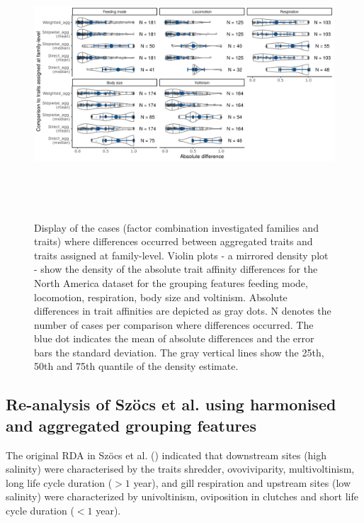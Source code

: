 \documentclass{article}
\begin{document}
\begin{figure}[H]
  \centering
  \includegraphics[width=16.5cm, height=10cm]{Deviances_trait_agg_pyne.png}
  \caption{Display of the cases (factor combination investigated families and traits) where differences occurred between aggregated traits and traits assigned at family-level. Violin plots - a mirrored density plot - show the density of the absolute trait affinity differences for the North America dataset for the grouping features feeding mode, locomotion, respiration, body size and voltinism. Absolute differences in trait affinities are depicted as gray dots. N denotes the number of cases per comparison where differences occurred. The blue dot indicates the mean of absolute differences and the error bars the standard deviation. The gray vertical lines show the 25th, 50th and 75th quantile of the density estimate.}
  \label{fig:diff_aggr_traits_pyne}
\end{figure}

\newpage 


\subsection*{Re-analysis of Szöcs et al. using harmonised and aggregated grouping features}

The original RDA in Szöcs et al. (\cite{szocs_effects_2014}) indicated that downstream sites (high salinity) were characterised by the traits shredder, ovoviviparity, multivoltinism, long life cycle duration ($> 1$ year), and gill respiration and upstream sites (low salinity) were characterized by univoltinism, oviposition in clutches and short life cycle duration ($< 1$ year). 
\end{document}
